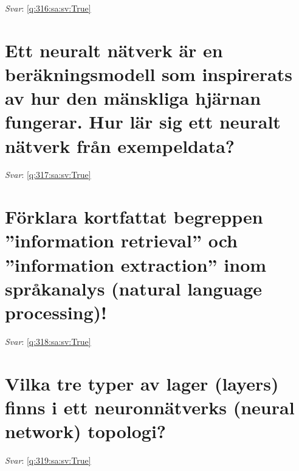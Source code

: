 \documentclass[a4paper,11pt,oneside]{book}
\begin{document}
\begin{sloppypar}
\vspace{1cm}

\textit{Svar}: \autoref{q:316:sa:sv:True}



\section{Ett neuralt n\"atverk \"ar en ber\"akningsmodell som inspirerats av hur den m\"anskliga hj\"arnan fungerar. Hur l\"ar sig ett neuralt n\"atverk fr\r{a}n exempeldata?}

\label{q:317:sa:sv:False}

\vspace{2cm}

\noindent\makebox[\textwidth]{\hrulefill}

\vspace{1cm}

\textit{Svar}: \autoref{q:317:sa:sv:True}



\section{F\"orklara kortfattat begreppen {\textquotedblright}information retrieval{\textquotedblright} och {\textquotedblright}information extraction{\textquotedblright} inom spr\r{a}kanalys (natural language processing)!}

\label{q:318:sa:sv:False}

\vspace{2cm}

\noindent\makebox[\textwidth]{\hrulefill}

\vspace{1cm}

\textit{Svar}: \autoref{q:318:sa:sv:True}



\section{Vilka tre typer av lager (layers) finns i ett neuronn\"atverks (neural network) topologi?}

\label{q:319:sa:sv:False}

\vspace{2cm}

\noindent\makebox[\textwidth]{\hrulefill}

\vspace{1cm}

\textit{Svar}: \autoref{q:319:sa:sv:True}




\end{sloppypar}
\end{document}

